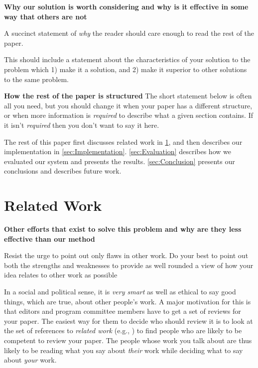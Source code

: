 \documentclass[pdf,bookmarks,colorlinks=true]{IEEEtran}
\begin{document}


\textbf{Why our solution is worth considering and why is it effective
in some way that others are not}

A succinct statement of {\em why} the reader should care enough to read the
rest of the paper.

This should include a statement about the characteristics of your solution to
the problem which 1) make it a solution, and 2) make it superior to other
solutions to the same problem.



\textbf{How the rest of the paper is structured}
The short statement below is often all you need, but you should change it when
your paper has a different structure, or when more information is {\em
required} to describe what a given section contains. If it isn't {\em required}
then you don't want to say it here.


The rest of this paper first discusses related work in
\ref{sec:RelatedWork}, and then describes our implementation in
\ref{sec:Implementation}. \ref{sec:Evaluation} describes how we evaluated
our system and presents the results. \ref{sec:Conclusion} presents our
conclusions and describes future work.

\section{Related Work}
\label{sec:RelatedWork}

\textbf{Other efforts that exist to solve this problem and why are they
less effective than our method}

Resist the urge to point out only flaws in other work. Do your best to point
out both the strengths and weaknesses to provide as well rounded a view of how
your idea relates to other work as possible

In a social and political sense, it is {\em very smart} as well as ethical to
say good things, which are true, about other people's work. A major motivation
for this is that editors and program committee members have to get a set of
reviews for your paper. The easiest way for them to decide who should review it
is to look at the set of references to {\em related work} (e.g.,
) to find people who are likely to be competent to
review your paper.  The people whose work you talk about are thus likely to be
reading what you say about {\em their} work while deciding what to say about
{\em your} work.
\end{document}
